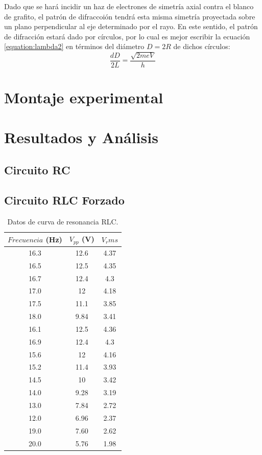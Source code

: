 \documentclass[%
 reprint,
 amsmath,amssymb,
 aps,
]{revtex4-1}
\begin{document}
Dado que se hará incidir un haz de electrones de simetría axial contra el blanco de grafito, el patrón de difraccoión tendrá esta misma simetría proyectada sobre un plano perpendicular al eje determinado por el rayo. En este sentido, el patrón de difracción estará dado por círculos, por lo cual es mejor escribir la ecuación \ref{equation:lambda2} en términos del diámetro $D = 2R$ de dichos círculos:\\

 \begin{equation}
\frac{dD}{2L} = \frac{\sqrt{2meV}}{h}
\label{equation:final}
\end{equation} 



\section{\label{sec:level1}Montaje experimental}


\section{\label{sec:level1}Resultados y An\'alisis}

\subsection{\label{sec:level2}Circuito RC}


\subsection{\label{sec:level2}Circuito RLC Forzado}


\begin{table}[h!]
\centering
 \begin{tabular}{|c|c|c|} 
 \hline
 $Frecuencia$ (Hz) & $V_{pp}$ (V) & $V_rms$ \\ [0.5ex] 
 \hline\hline
16.3 &		12.6 &		4.37\\
16.5 &		12.5 &		4.35\\
16.7 &		12.4 &		4.3\\
17.0 &		12 &		4.18\\
17.5 &		11.1 &		3.85\\
18.0 &		9.84 &		3.41\\
16.1 &		12.5 &		4.36\\
16.9 &		12.4 &		4.3\\
15.6 &		12 &		4.16\\
15.2 &		11.4 &		3.93\\
14.5 &		10 &		3.42\\
14.0 &		9.28 &		3.19\\
13.0 &		7.84 &		2.72\\
12.0 &		6.96 &		2.37\\
19.0 &		7.60 &		2.62\\
20.0 &		5.76 &		1.98\\
[1ex] 
 \hline
 \end{tabular}
 \caption{Datos de curva de resonancia RLC.}
 \label{table:resonancia}
\end{table}
\end{document}
